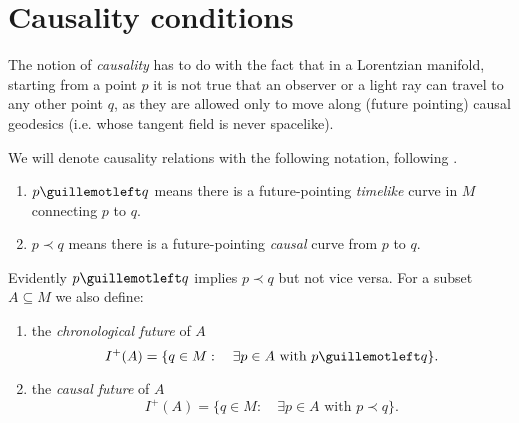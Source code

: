 
\section{Causality conditions}

The notion of \emph{causality} has to do with the fact that in a Lorentzian manifold, starting from a  point \(p\) it is not true that an observer or a light ray can travel to any other point \(q\), as they are allowed only to move along (future pointing) causal geodesics (i.e. whose tangent field is never spacelike).


We will denote causality relations with the following notation, following \cite{o1983semi}.
\begin{enumerate}
	\item  \(p \guillemotleft q\) means there is a future-pointing \emph{timelike} curve in \(M\) connecting \(p\) to \(q\).
	\item \(p \prec q\) means there is a future-pointing \emph{causal} curve from \(p\) to \(q\).
\end{enumerate}

Evidently \(p\guillemotleft q\) implies \(p\prec q\) but not vice versa. For a subset \(A \subseteq M\) we also define:
\begin{enumerate}
	\item the \emph{chronological future} of \(A\)
	\[
	I^+(A) =\{ q\in M :\quad\exists p \in A\text{ with } p\guillemotleft q\}.
	\]
	\item the \emph{causal future} of \(A\)
	\[
	I^+(A) =\{ q\in M : \quad\exists p \in A\text{ with } p\prec q\}.
	\]
\end{enumerate}
